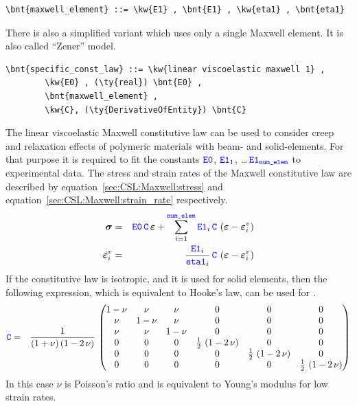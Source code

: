 \begin{Verbatim}[commandchars=\\\{\}]
    \bnt{maxwell_element} ::= \kw{E1} , \bnt{E1} , \kw{eta1} , \bnt{eta1}
\end{Verbatim}
There is also a simplified variant which uses only a single Maxwell element. It is also called ``Zener'' model.
\begin{Verbatim}[commandchars=\\\{\}]
    \bnt{specific_const_law} ::= \kw{linear viscoelastic maxwell 1} ,
        \kw{E0} , (\ty{real}) \bnt{E0} ,
        \bnt{maxwell_element} ,
        \kw{C}, (\ty{DerivativeOfEntity}) \bnt{C}
\end{Verbatim}
The linear viscoelastic Maxwell constitutive law can be used to consider creep and relaxation effects of polymeric materials with beam- and solid-elements.
For that purpose it is required to fit the constants $\textcolor{blue}{\texttt{E0}}$, $\textcolor{blue}{\texttt{E1}}_1$, \ldots $\,\textcolor{blue}{\texttt{E1}}_{\textcolor{blue}{\texttt{num\_elem}}}$ to experimental data.
The stress and strain rates of the Maxwell constitutive law are described by equation~\ref{sec:CSL:Maxwell:stress} and equation~\ref{sec:CSL:Maxwell:strain_rate} respectively.
\begin{eqnarray}
  \boldsymbol{\sigma} &=& \textcolor{blue}{\texttt{E0}} \, \textcolor{blue}{\texttt{C}} \, \boldsymbol{\varepsilon} + \sum_{i=1}^{\textcolor{blue}{\texttt{num\_elem}}} \textcolor{blue}{\texttt{E1}}_i \, \textcolor{blue}{\texttt{C}} \, \left(\boldsymbol{\varepsilon} - \boldsymbol{\varepsilon}_i^v\right) \label{sec:CSL:Maxwell:stress} \\
  \dot{\boldsymbol{\varepsilon}}_i^v &=& \frac{\textcolor{blue}{\texttt{E1}}_i}{\textcolor{blue}{\texttt{eta1}}_i} \, \textcolor{blue}{\texttt{C}} \, \left(\boldsymbol{\varepsilon} - \boldsymbol{\varepsilon}_i^v\right) \label{sec:CSL:Maxwell:strain_rate}
\end{eqnarray}
If the constitutive law is isotropic, and it is used for solid elements, then the following expression, which is equivalent to Hooke's law, can be used for .
\begin{eqnarray}
  \textcolor{blue}{\texttt{C}} &=& \frac{1}{\left(1 + \nu\right)\left(1 - 2 \, \nu\right)} \, \begin{pmatrix}
    1 - \nu & \nu & \nu & 0 & 0 & 0 \\
    \nu & 1 - \nu & \nu & 0 & 0 & 0 \\
    \nu & \nu & 1 - \nu & 0 & 0 & 0 \\
    0 & 0 & 0 & \frac{1}{2} \, \left(1 - 2 \, \nu\right) & 0 & 0 \\
    0 & 0 & 0 & 0 & \frac{1}{2} \, \left(1 - 2 \, \nu\right) & 0 \\
    0 & 0 & 0 & 0 & 0 & \frac{1}{2} \, \left(1 - 2 \, \nu\right)
  \end{pmatrix}
\end{eqnarray}
In this case $\nu$ is Poisson's ratio and  is equivalent to Young's modulus for low strain rates.
